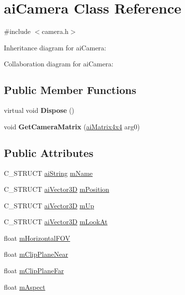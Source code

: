 \hypertarget{structai_camera}{\section{ai\+Camera Class Reference}
\label{structai_camera}
}


{\ttfamily \#include $<$camera.\+h$>$}



Inheritance diagram for ai\+Camera\+:


Collaboration diagram for ai\+Camera\+:
\subsection*{Public Member Functions}
\begin{DoxyCompactItemize}
\item 
\hypertarget{structai_camera_a6fd67a15b892c38b2fbe1d8fe4b04dd4}{virtual void {\bfseries Dispose} ()}\label{structai_camera_a6fd67a15b892c38b2fbe1d8fe4b04dd4}

\item 
\hypertarget{structai_camera_ad5452a0b9e0a0130c5f1c78e8676d9e1}{void {\bfseries Get\+Camera\+Matrix} (\hyperlink{structai_matrix4x4}{ai\+Matrix4x4} arg0)}\label{structai_camera_ad5452a0b9e0a0130c5f1c78e8676d9e1}

\end{DoxyCompactItemize}
\subsection*{Public Attributes}
\begin{DoxyCompactItemize}
\item 
C\+\_\+\+S\+T\+R\+U\+C\+T \hyperlink{structai_string}{ai\+String} \hyperlink{structai_camera_aa6a5fe5e04b3db1b23f69eb9910c6816}{m\+Name}
\item 
C\+\_\+\+S\+T\+R\+U\+C\+T \hyperlink{structai_vector3_d}{ai\+Vector3\+D} \hyperlink{structai_camera_a518617ea192ca0698e748a4399e7c3a5}{m\+Position}
\item 
C\+\_\+\+S\+T\+R\+U\+C\+T \hyperlink{structai_vector3_d}{ai\+Vector3\+D} \hyperlink{structai_camera_a7fb42b287389b4f99c883098268d6d1a}{m\+Up}
\item 
C\+\_\+\+S\+T\+R\+U\+C\+T \hyperlink{structai_vector3_d}{ai\+Vector3\+D} \hyperlink{structai_camera_af9463249ac870e030fa435b1186cef23}{m\+Look\+At}
\item 
float \hyperlink{structai_camera_adcdea73ece19ea0a9068f5544ec23592}{m\+Horizontal\+F\+O\+V}
\item 
float \hyperlink{structai_camera_a720e8c94c036dcefe4b13cc1c69c521e}{m\+Clip\+Plane\+Near}
\item 
float \hyperlink{structai_camera_aa9ccf77e3d7ca3dc8f46df931b65172f}{m\+Clip\+Plane\+Far}
\item 
float \hyperlink{structai_camera_ae414556eaa6f910b5927f465d97bf70c}{m\+Aspect}
\end{DoxyCompactItemize}
